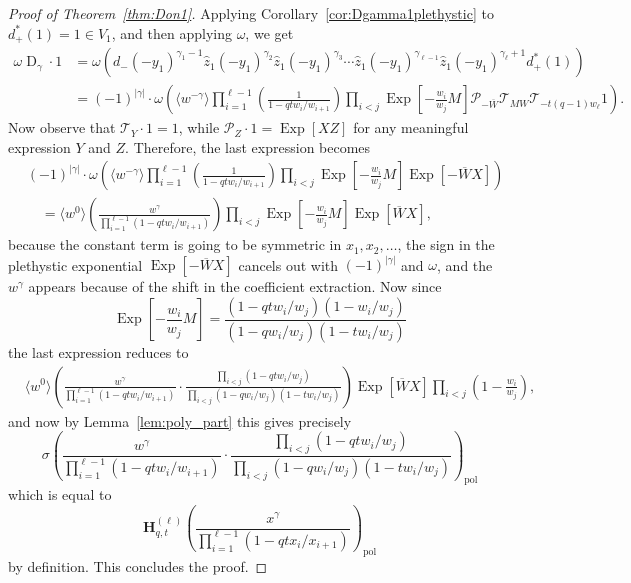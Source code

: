 \documentclass[reqno]{amsart}
\theoremstyle{plain}
\theoremstyle{definition}
\theoremstyle{remark}
\DeclareMathOperator{\D}{D}
\DeclareMathOperator{\Exp}{Exp}
\newcommand{\z}{\widehat{z}}
\newcommand{\<}{\langle}
\renewcommand{\>}{\rangle}
\begin{document}
\begin{proof}[Proof of Theorem~\ref{thm:Don1}]
    Applying Corollary~\ref{cor:Dgamma1plethystic} to $d_+^*(1)=1 \in V_1$, and then applying $\omega$, we get 
    \begin{align*}
    \omega \D_\gamma \cdot 1 & = \omega \left( d_- (-y_1)^{\gamma_{1}-1} \z_1 (-y_1)^{\gamma_{2}} \z_1 (-y_1)^{\gamma_{3}} \cdots \z_1 (-y_1)^{\gamma_{\ell-1}} \z_1 (-y_1)^{\gamma_{\ell}+1} d_+^* (1) \right) \\
        & = (-1)^{\lvert \gamma \rvert} \cdot \omega \left( \langle w^{-\gamma} \rangle \prod_{i=1}^{\ell-1} \left(\frac{1}{1-qtw_{i}/w_{i+1}}\right) \prod_{i<j} \Exp\left[-\frac{w_{i}}{w_j} M\right] \mathcal{P}_{-\overline{W}}  \mathcal{T}_{MW} \mathcal{T}_{-t(q-1)w_\ell} 1 \right).
    \end{align*}
    Now observe that $\mathcal{T}_Y \cdot 1 = 1$, while $\mathcal{P}_Z \cdot 1 = \Exp[XZ]$ for any meaningful expression $Y$ and $Z$. Therefore, the last expression becomes
    \begin{align*}
        & (-1)^{\lvert \gamma \rvert} \cdot \omega \left( \langle w^{-\gamma} \rangle \prod_{i=1}^{\ell-1} \left(\frac{1}{1-qtw_{i}/w_{i+1}}\right) \prod_{i<j} \Exp\left[-\frac{w_{i}}{w_j} M\right] \Exp\left[-\overline{W}X\right] \right) \\
        & \quad = \langle w^0 \rangle \left(\frac{w^\gamma}{\prod_{i=1}^{\ell-1}(1-qtw_{i}/w_{i+1})}\right) \prod_{i<j}\Exp\left[-\frac{w_{i}}{w_j} M\right] \Exp\left[\overline{W}X\right],
    \end{align*}
    because the constant term is going to be symmetric in $x_1,x_2,\dots$, the sign in the plethystic exponential $\Exp[-\overline{W}X]$ cancels out with $(-1)^{\lvert \gamma \rvert}$ and $\omega$, and the $w^\gamma$ appears because of the shift in the coefficient extraction.
    Now since
    \[ \Exp\left[-\frac{w_i}{w_j}M\right] = \frac{(1-qtw_i/w_j)(1-w_i/w_j)}{(1-qw_i/w_j)(1-tw_i/w_j)} \]
    the last expression reduces to
    \begin{align*}
        &   \langle w^0 \rangle  \left(\frac{w^\gamma}{\prod_{i=1}^{\ell-1}(1-qtw_{i}/w_{i+1})}\cdot \frac{\prod_{i<j}(1-qtw_i/w_j)}{\prod_{i<j}(1-qw_i/w_j)(1-tw_i/w_j)}\right) \Exp\left[\overline{W}X\right]\prod_{i<j}\left(1-\frac{w_{i}}{w_j}\right),
    \end{align*}
    and now by Lemma~\ref{lem:poly_part} this gives precisely
    \[
        \textbf{$\sigma$} \left(\frac{w^\gamma}{\prod_{i=1}^{\ell-1}(1-qtw_{i}/w_{i+1})}\cdot \frac{\prod_{i<j}(1-qtw_i/w_j)}{\prod_{i<j}(1-qw_i/w_j)(1-tw_i/w_j)}\right)_{\text{pol}}
    \]
    which is equal to
    \[ 
        \mathbf{H}_{q,t}^{(\ell)}\left(\frac{x^\gamma}{\prod_{i=1}^{\ell-1}(1-qtx_{i}/x_{i+1})} \right)_{\mathrm{pol}}
    \]
    by definition. This concludes the proof.
\end{proof}
\end{document}
